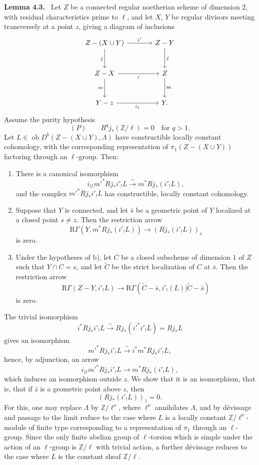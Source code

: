\documentclass[11pt]{article}
\newenvironment{statement}[1]{\par\medskip\noindent\textbf{#1.}\ }{\par\medskip}
\providecommand{\Ob}{\operatorname{ob}}
\providecommand{\Ob}{\operatorname{ob}}
\providecommand{\Ob}{\operatorname{Ob}}
\begin{document}
\begin{statement}{Lemma 4.3}
Let $Z$ be a connected regular noetherian scheme of dimension $2$, with residual characteristics prime to $\ell$, and let $X$, $Y$ be regular divisors meeting transversely at a point $z$, giving a diagram of inclusions
\[
\begin{tikzcd}[column sep=large,row sep=large]
Z-(X\cup Y) \arrow[r,"i'"] \arrow[d,"j"'] & Z-Y \arrow[d,"j"]\\
Z-X \arrow[r,"i"'] \arrow[d,"m"'] & Z \arrow[d,"m"]\\
Y-z \arrow[r,"i_1"'] & Y .
\end{tikzcd}
\]
Assume the purity hypothesis
\[
(P)\qquad R^qj_*(\mathbb Z/\ell)=0\quad\text{for }q>1.
\]
Let $L\in\Ob D^b(Z-(X\cup Y),\Lambda)$ have constructible locally constant cohomology, with the corresponding representation of $\pi_1(Z-(X\cup Y))$ factoring through an $\ell$-group. Then:
\begin{enumerate}[label=\alph*)]
\item There is a canonical isomorphism
\[
i_{1!}m'^*Rj_*i'_!L\xrightarrow{\sim} m^*Rj_*(i'_!L),
\]
and the complex $m'^*Rj_*i'_!L$ has constructible, locally constant cohomology.
\item Suppose that $Y$ is connected, and let $\bar s$ be a geometric point of $Y$ localized at a closed point $s\ne z$. Then the restriction arrow
\begin{equation}
\mathrm R\Gamma(Y,m^*Rj_*(i'_!L))\longrightarrow (Rj_*(i'_!L))_{\bar s}
\tag{4.3.1}
\end{equation}
is zero.
\item Under the hypotheses of b), let $C$ be a closed subscheme of dimension $1$ of $Z$ such that $Y\cap C=s$, and let $\widetilde C$ be the strict localization of $C$ at $\bar s$. Then the restriction arrow
\begin{equation}
\mathrm R\Gamma(Z-Y,i'_!L)
\longrightarrow
\mathrm R\Gamma(\widetilde C-\bar s,i'_!(L)|\widetilde C-\bar s)
\tag{4.3.2}
\end{equation}
is zero.
\end{enumerate}
\end{statement}

The trivial isomorphism
\[
i^*Rj_*i'_!L\xrightarrow{\sim}Rj_*(i'^*i'_!L)=Rj_*L
\]
gives an isomorphism
\[
m'^*Rj_*i'_!L\xrightarrow{\sim} i^*m^*Rj_*i'_!L,
\]
hence, by adjunction, an arrow
\[
i_{1!}m'^*Rj_*i'_!L\longrightarrow m^*Rj_*(i'_!L),
\]
which induces an isomorphism outside $z$. We show that it is an isomorphism, that is, that if $\bar z$ is a geometric point above $z$, then
\[
(Rj_*(i'_!L))_{\bar z}=0.
\]
For this, one may replace $\Lambda$ by $\mathbb Z/\ell^\nu$, where $\ell^\nu$ annihilates $\Lambda$, and by dévissage and passage to the limit reduce to the case where $L$ is a locally constant $\mathbb Z/\ell^\nu$-module of finite type corresponding to a representation of $\pi_1$ through an $\ell$-group. Since the only finite abelian group of $\ell$-torsion which is simple under the action of an $\ell$-group is $\mathbb Z/\ell$ with trivial action, a further dévissage reduces to the case where $L$ is the constant sheaf $\mathbb Z/\ell$.
\end{document}
